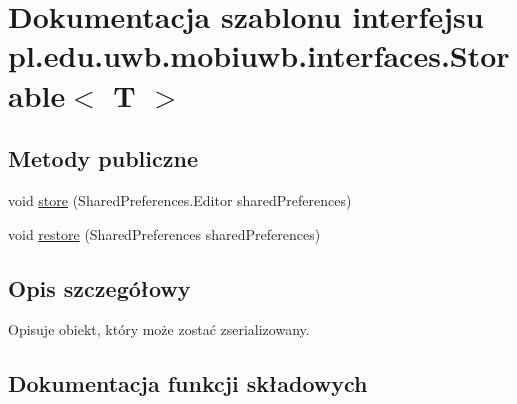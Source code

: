 \hypertarget{interfacepl_1_1edu_1_1uwb_1_1mobiuwb_1_1interfaces_1_1_storable}{}\section{Dokumentacja szablonu interfejsu pl.\+edu.\+uwb.\+mobiuwb.\+interfaces.\+Storable$<$ T $>$}
\label{interfacepl_1_1edu_1_1uwb_1_1mobiuwb_1_1interfaces_1_1_storable}
\subsection*{Metody publiczne}
\begin{DoxyCompactItemize}
\item 
void \hyperlink{interfacepl_1_1edu_1_1uwb_1_1mobiuwb_1_1interfaces_1_1_storable_ab6664cd79017ad86b7e23daddee33b06}{store} (Shared\+Preferences.\+Editor shared\+Preferences)
\item 
void \hyperlink{interfacepl_1_1edu_1_1uwb_1_1mobiuwb_1_1interfaces_1_1_storable_a7749fa9be37e5fc14f9006502d97e637}{restore} (Shared\+Preferences shared\+Preferences)
\end{DoxyCompactItemize}


\subsection{Opis szczegółowy}
Opisuje obiekt, który może zostać zserializowany. 

\subsection{Dokumentacja funkcji składowych}
\hypertarget{interfacepl_1_1edu_1_1uwb_1_1mobiuwb_1_1interfaces_1_1_storable_a7749fa9be37e5fc14f9006502d97e637}{}
